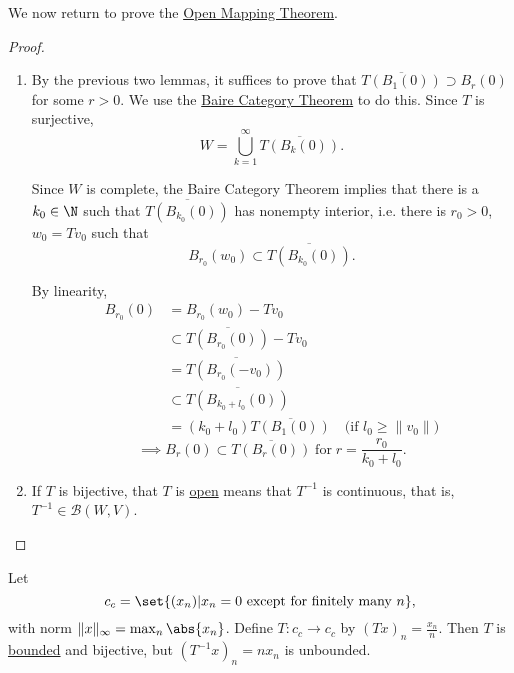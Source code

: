 \documentclass{article}
\begin{document}
We now return to prove the \hyperlink{thm:omt}{Open Mapping Theorem}.
\begin{proof}
    \leavevmode
    \begin{enumerate}[label=(\roman*)]
        \item By the previous two lemmas, it suffices to prove that $\overline{T(B_1(0))} \supset B_r(0)$ for some $r > 0$. We use the \hyperlink{thm:baireCategory}{Baire Category Theorem} to do this. Since $T$ is surjective,
            \begin{equation*}
                W = \bigcup_{k=1}^\infty \overline{T(B_k(0))}.
            \end{equation*}

            Since $W$ is complete, the Baire Category Theorem implies that there is a $k_0 \in \N$ such that $\overline{T(B_{k_0}(0))}$ has nonempty interior, i.e. there is $r_0 > 0$, $w_0 = T v_0$ such that
            \begin{equation*}
                B_{r_0}(w_0) \subset \overline{T(B_{k_0}(0))}.
            \end{equation*}

            By linearity,
            \begin{align*}
                B_{r_0}(0) &= B_{r_0}(w_0) - T v_0 \\
                           &\subset \overline{T(B_{r_0}(0))} - T v_0 \\
                           &= \overline{T(B_{r_0}(-v_0))} \\
                           &\subset \overline{T(B_{k_0 + l_0}(0))} \\
                           &= (k_0 + l_0) \overline{T(B_1(0))} \quad \text{(if $l_0 \geq \|v_0\|$)}
            \end{align*}
            \begin{equation*}
                \implies B_r(0) \subset \overline{T(B_r(0))} \; \text{for} \; r = \frac{r_0}{k_0 + l_0}.
            \end{equation*}

        \item If $T$ is bijective, that $T$ is \hyperlink{def:openMap}{open} means that $T^{-1}$ is continuous, that is, $T^{-1} \in \mathcal{B}(W, V)$. \qedhere
    \end{enumerate}
\end{proof}

\begin{eg}
    Let \begin{equation*}c_c = \set{(x_n) | x_n = 0 \text{ except for finitely many } n},\end{equation*} with norm $\|x\|_\infty = \max_n \abs{x_n}$.
    Define $T: c_c \to c_c$ by $(T x)_n = \frac{x_n}{n}$.
    Then $T$ is \hyperlink{def:boundedLinearMap}{bounded} and bijective, but $(T^{-1} x)_n = n x_n$ is unbounded.
\end{eg}
\end{document}
